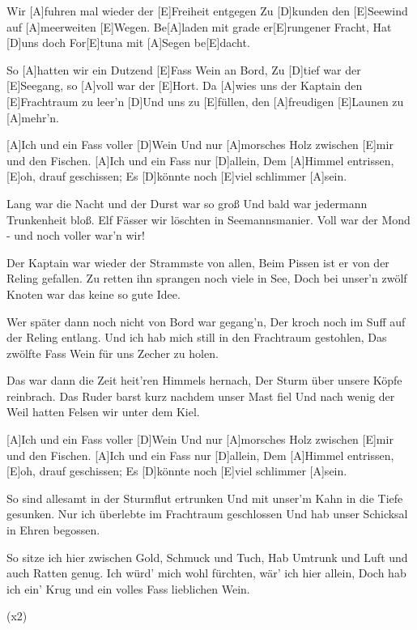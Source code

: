 

\begin{guitar}
	Wir [A]fuhren mal wieder der [E]Freiheit entgegen
	Zu [D]kunden den [E]Seewind auf [A]meerweiten [E]Wegen.
	Be[A]laden mit grade er[E]rungener Fracht,
	Hat [D]uns doch For[E]tuna mit [A]Segen be[E]dacht.
	
	So [A]hatten wir ein Dutzend [E]Fass Wein an Bord,
	Zu [D]tief war der [E]Seegang, so [A]voll war der [E]Hort.
	Da [A]wies uns der Kaptain den [E]Frachtraum zu leer'n
	[D]Und uns zu [E]füllen, den [A]freudigen [E]Launen zu [A]mehr'n.
	
  \smallskip
	[A]Ich und ein Fass voller [D]Wein
	Und nur [A]morsches Holz zwischen [E]mir und den Fischen.
	[A]Ich und ein Fass nur [D]allein,
	Dem [A]Himmel entrissen, [E]oh, drauf geschissen;
	Es [D]könnte noch [E]viel schlimmer [A]sein.
	
	Lang war die Nacht und der Durst war so groß
	Und bald war jedermann Trunkenheit bloß.
	Elf Fässer wir löschten in Seemannsmanier.
	Voll war der Mond - und noch voller war'n wir!
	
	Der Kaptain war wieder der Strammste von allen,
	Beim Pissen ist er von der Reling gefallen.
	Zu retten ihn sprangen noch viele in See,
	Doch bei unser'n zwölf Knoten war das keine so gute Idee.
	
	 
	
	\pagebreak
	
	Wer später dann noch nicht von Bord war gegang'n,
	Der kroch noch im Suff auf der Reling entlang.
	Und ich hab mich still in den Frachtraum gestohlen,
	Das zwölfte Fass Wein für uns Zecher zu holen.
	
	Das war dann die Zeit heit'ren Himmels hernach,
	Der Sturm über unsere Köpfe reinbrach.
	Das Ruder barst kurz nachdem unser Mast fiel
	Und nach wenig der Weil hatten Felsen wir unter dem Kiel.
	
  \smallskip
	[A]Ich und ein Fass voller [D]Wein
	Und nur [A]morsches Holz zwischen [E]mir und den Fischen.
	[A]Ich und ein Fass nur [D]allein,
	Dem [A]Himmel entrissen, [E]oh, drauf geschissen;
	Es [D]könnte noch [E]viel schlimmer [A]sein.
	
	So sind allesamt in der Sturmflut ertrunken
	Und mit unser'm Kahn in die Tiefe gesunken.
	Nur ich überlebte im Frachtraum geschlossen
	Und hab unser Schicksal in Ehren begossen.
	
	So sitze ich hier zwischen Gold, Schmuck und Tuch,
	Hab Umtrunk und Luft und auch Ratten genug.
	Ich würd' mich wohl fürchten, wär' ich hier allein,
	Doch hab ich ein' Krug und ein volles Fass lieblichen Wein.
	
	  (x2)
\end{guitar}

